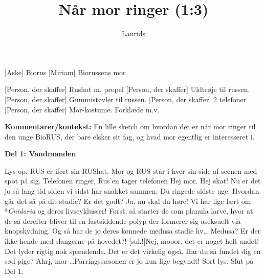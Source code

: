 \documentclass[a4paper,11pt]{article}
\title{Når mor ringer (1:3)}
\author{Laurids}
\begin{document}
\maketitle

\begin{roles}
    [Aske] Biorus
    [Miriam] Biorussens mor
\end{roles}

\begin{props}
    [Person, der skaffer] Rushat m. propel
    [Person, der skaffer] Uldtrøje til russen.
    [Person, der skaffer] Gummistøvler til russen.
    [Person, der skaffer] 2 telefoner
    [Person, der skaffer] Mor-kostume. Forklæde m.v.
\end{props}

\textbf{Kommentarer/kontekst:}
En lille sketch om hvordan det er når mor ringer til den unge BioRUS, der bare elsker sit fag, og hvad mor egentlig er interesseret i.




\begin{sketch}

\begin{center}

\textbf{Del 1: Vandmanden}
\end{center}

\scene Lys op. RUS er iført sin RUShat.
\scene Mor og RUS står i hver sin side af scenen med spot på sig. 
\scene Telefonen ringer, Rus'en tager telefonen
 Hej mor.
 Hej skat! Nu er det jo så lang tid siden vi sidst har snakket sammen.
 Du ringede sidste uge.
 Hvordan går det så på dit studie? Er det godt?
 Ja, nu skal du høre! Vi har lige lært om ª\textit{Cnidaria} og deres livscyklusser! Først, så starter de som planula larve, hvor at de så derefter bliver til en fastsiddende polyp der formerer sig aseksuelt via knopskydning. Og så har de jo deres kønnede medusa stadie hv\ldots
{}Medusa? Er der ikke hende med slangerne på hovedet?!
[suk!]Nej, mooor, det er noget helt andet! 
 Det lyder rigtig nok spændende.
 Det er det virkelig også.
 Har du så fundet dig en sød pige?
 Ahrj, mor \ldots Parringssæsonen er jo kun lige begyndt!
Sort lys. 
Slut på Del 1.



\end{sketch}
\end{document}
